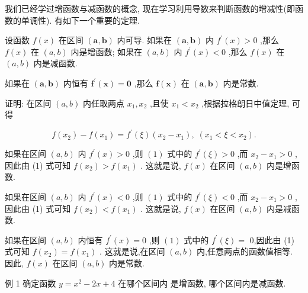 \documentclass[lang=cn,newtx,10pt,scheme=chinese]{elegantbook}
\begin{document}
我们已经学过增函数与减函数的概念, 现在学习利用导数来判断函数的增减性(即函数的单调性). 有如下一个重要的定理.

\begin{theorem}[定理]

设函数 \(f\left( x\right)\) 在区间 \(\left( {\mathbf{a},\mathbf{b}}\right)\) 内可导. 如果在 \(\left( {\mathbf{a},\mathbf{b}}\right)\) 内 \({f}^{\prime }\left( x\right) > 0\) ,那么 \(f\left( x\right)\) 在 \(\left( {a,b}\right)\) 内是增函数; 如果在 \(\left( {a,b}\right)\) 内 \({f}^{\prime }\left( x\right) < 0\) ,那么 \(f\left( x\right)\) 在 \(\left( {a,b}\right)\) 内是减函数.

如果在 \(\left( {\mathbf{a},\mathbf{b}}\right)\) 内恒有 \({\mathbf{f}}^{\prime }\left( \mathbf{x}\right) = \mathbf{0}\) ,那么 \(\mathbf{f}\left( \mathbf{x}\right)\) 在 \(\left( {\mathbf{a},\mathbf{b}}\right)\) 内是常数.

\end{theorem}

证明: 在区间 \(\left( {a,b}\right)\) 内任取两点 \({x}_{1},{x}_{2}\) ,且使 \({x}_{1} < {x}_{2}\) ,根据拉格朗日中值定理, 可得

\[
f\left( {x}_{2}\right) - f\left( {x}_{1}\right) = {f}^{\prime }\left( \xi \right) \left( {{x}_{2} - {x}_{1}}\right) ,\;\left( {{x}_{1} < \xi < {x}_{2}}\right) . \tag{1}
\]

如果在区间 \(\left( {a,b}\right)\) 内 \({f}^{\prime }\left( x\right) > 0\) ,则 \(\left( 1\right)\) 式中的 \({f}^{\prime }\left( \xi \right) > 0\) ,而 \({x}_{2} - {x}_{1} > 0\) ,因此由 (1) 式可知 \(f\left( {x}_{2}\right) > f\left( {x}_{1}\right)\) . 这就是说, \(f\left( x\right)\) 在区间 \(\left( {a,b}\right)\) 内是增函数.

如果在区间 \(\left( {a,b}\right)\) 内 \({f}^{\prime }\left( x\right) < 0\) ,则 \(\left( 1\right)\) 式中的 \({f}^{\prime }\left( \xi \right) < 0\) ,而 \({x}_{2} - {x}_{1} > 0\) ,因此由 (1) 式可知 \(f\left( {x}_{2}\right) < f\left( {x}_{1}\right)\) . 这就是说, \(f\left( x\right)\) 在区间 \(\left( {a,b}\right)\) 内是减函数.

如果在区间 \(\left( {a,b}\right)\) 内恒有 \({f}^{\prime }\left( x\right) = 0\) ,则 \(\left( 1\right)\) 式中的 \({f}^{\prime }\left( \xi \right) =\) 0,因此由 (1) 式可知 \(f\left( {x}_{2}\right) = f\left( {x}_{1}\right)\) . 这就是说,在区间 \(\left( {a,b}\right)\) 内,任意两点的函数值相等. 因此, \(f\left( x\right)\) 在区间 \(\left( {a,b}\right)\) 内是常数.

例 1 确定函数 \(y = {x}^{2} - {2x} + 4\) 在哪个区间内 是增函数, 哪个区间内是减函数.
\end{document}
